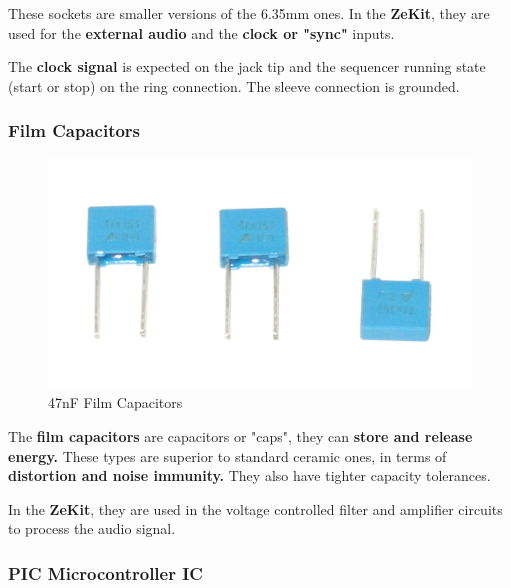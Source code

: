\documentclass{scrartcl}
\begin{document}
These sockets are smaller versions of the 6.35mm ones. In the \textbf{ZeKit}, they are used for the \textbf{external audio} and the \textbf{clock or "sync"} inputs.

The \textbf{clock signal} is expected on the jack tip and the sequencer running state (start or stop) on the ring connection. The sleeve connection is grounded.

\subsubsection{Film Capacitors}

\begin{figure}[!ht]
    \begin{center}
        \includegraphics[scale=0.15]{assets/zekit-caps.jpg}
        \caption{47nF Film Capacitors}
    \end{center}
\end{figure}

The \textbf{film capacitors} are capacitors or "caps", they can \textbf{store and release energy.} These types are superior to standard ceramic ones, in terms of \textbf{distortion and noise immunity.}
They also have tighter capacity tolerances.

In the \textbf{ZeKit}, they are used in the voltage controlled filter and amplifier circuits to process the audio signal.

\pagebreak
\subsubsection{PIC Microcontroller IC}
\end{document}
